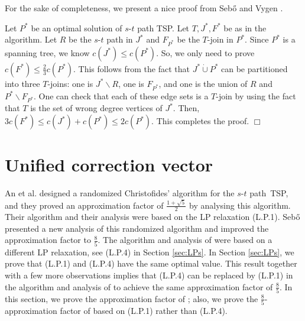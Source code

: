 \documentclass[11pt]{article}
\newcommand{\qed}{\hspace*{\fill}$\Box$}
\newenvironment{proof}[1][Proof. ]{\noindent {\bf #1 }}{\qed}
\begin{document}
For the sake of completeness, we present a nice proof from Seb\H{o} and Vygen \cite{SV12}.

\vspace{3mm}

\begin{proof}
Let $P^*$ be an optimal solution of $s$-$t$ path TSP. Let $T, J^*, F^*$ be as in the algorithm. Let $R$ be the $s$-$t$ path in $J^*$
 and $F_{P^*}$ be the $T$-join in $P^*$. Since $P^*$ is a spanning tree,
 we know $c(J^*)\leq c(P^*)$. So, we only need to prove $c(F^*)\leq \frac{2}{3} c(P^*)$.
 This follows from the fact that $J^*\dot{\cup}P^*$ can be partitioned into three $T$-joins:
 one is $J^*\backslash R$, one is $F_{P^*}$,
 and one is the union of $R$ and $P^*\backslash F_{P^*}$. One can check that each of these edge sets is a $T$-join
 by using the fact that $T$ is the set of wrong degree vertices of $J^*$.
  Then, $3c(F^*)\leq c(J^*)+c(P^*)\leq 2c(P^*)$. This completes the proof.
\end{proof}



\section{Unified correction vector}\label{sec:ucv}

An et al. \cite{AKS12} designed a randomized Christofides' algorithm for the $s$-$t$ path~TSP, and
they proved an approximation factor of
$\frac{1+\sqrt{5}}{2}$ by analysing this algorithm.
Their algorithm and their analysis were based on the LP relaxation (L.P.1).
Seb\H{o} \cite{sebo13} presented a new analysis of this randomized algorithm
and improved the approximation factor to $\frac{8}{5}$.
The algorithm and analysis of \cite{sebo13} were based on
a different LP relaxation, see (L.P.4) in Section \ref{sec:LPs}.
In Section \ref{sec:LPs}, we prove that
(L.P.1) and (L.P.4) have the same optimal value.
This result together with a few more observations implies that
(L.P.4) can be replaced by (L.P.1) in
the algorithm and analysis of \cite{sebo13}
to achieve the same approximation factor of $\frac{8}{5}$.
In this section,
we prove the approximation factor of \cite{AKS12}; also,
we prove the $\frac{8}{5}$-approximation factor of \cite{sebo13}
based on (L.P.1) rather than (L.P.4).





\bigskip
\end{document}
